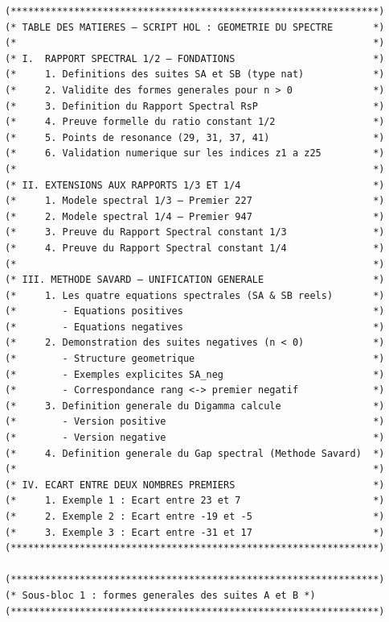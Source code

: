 \documentclass[a4paper,11pt]{article}
\begin{document}
\begin{holcode}[title={\textcolor{white}{Fichier : methode\_spectral.thy -- Partie 1/4}}]
\begin{lstlisting}
(****************************************************************)
(* TABLE DES MATIERES – SCRIPT HOL : GEOMETRIE DU SPECTRE       *)
(*                                                              *)
(* I.  RAPPORT SPECTRAL 1/2 – FONDATIONS                        *)
(*     1. Definitions des suites SA et SB (type nat)            *)
(*     2. Validite des formes generales pour n > 0              *)
(*     3. Definition du Rapport Spectral RsP                    *)
(*     4. Preuve formelle du ratio constant 1/2                 *)
(*     5. Points de resonance (29, 31, 37, 41)                  *)
(*     6. Validation numerique sur les indices z1 a z25         *)
(*                                                              *)
(* II. EXTENSIONS AUX RAPPORTS 1/3 ET 1/4                       *)
(*     1. Modele spectral 1/3 – Premier 227                     *)
(*     2. Modele spectral 1/4 – Premier 947                     *)
(*     3. Preuve du Rapport Spectral constant 1/3               *)
(*     4. Preuve du Rapport Spectral constant 1/4               *)
(*                                                              *)
(* III. METHODE SAVARD – UNIFICATION GENERALE                   *)
(*     1. Les quatre equations spectrales (SA & SB reels)       *)
(*        - Equations positives                                 *)
(*        - Equations negatives                                 *)
(*     2. Demonstration des suites negatives (n < 0)            *)
(*        - Structure geometrique                               *)
(*        - Exemples explicites SA_neg                          *)
(*        - Correspondance rang <-> premier negatif             *)
(*     3. Definition generale du Digamma calcule                *)
(*        - Version positive                                    *)
(*        - Version negative                                    *)
(*     4. Definition generale du Gap spectral (Methode Savard)  *)
(*                                                              *)
(* IV. ECART ENTRE DEUX NOMBRES PREMIERS                        *)
(*     1. Exemple 1 : Ecart entre 23 et 7                       *)
(*     2. Exemple 2 : Ecart entre -19 et -5                     *)
(*     3. Exemple 3 : Ecart entre -31 et 17                     *)
(****************************************************************)

(****************************************************************)
(* Sous-bloc 1 : formes generales des suites A et B *)
(****************************************************************)


\end{lstlisting}
\end{holcode}
\end{document}
